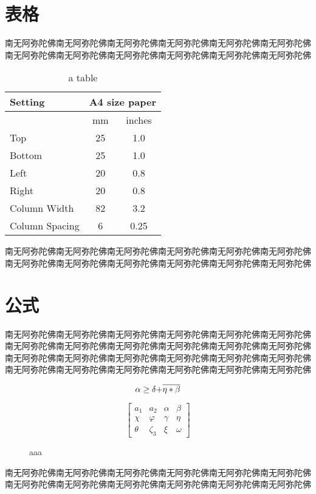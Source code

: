 \documentclass[UTF8,a4paper,10pt]{article}
\begin{document}
\section{表格}
南无阿弥陀佛南无阿弥陀佛南无阿弥陀佛南无阿弥陀佛南无阿弥陀佛南无阿弥陀佛南无阿弥陀佛南无阿弥陀佛南无阿弥陀佛南无阿弥陀佛南无阿弥陀佛南无阿弥陀佛
\par
\vspace{3ex}
\begin{table}[h]
    \centering
    \begin{tabular}{|l|c|c|}\hline
        Setting&\multicolumn{2}{c|}{A4 size paper}\\\hline
        &mm&inches\\
        Top&25&1.0\\
        Bottom&25&1.0\\
        Left&20&0.8\\
        Right&20&0.8\\
        Column Width&82&3.2\\
        Column Spacing&6&0.25\\\hline
    \end{tabular}
    \caption{a table}
    \label{tab:table1}
\end{table}
\vspace{3ex}
\noindent 南无阿弥陀佛南无阿弥陀佛南无阿弥陀佛南无阿弥陀佛南无阿弥陀佛南无阿弥陀佛南无阿弥陀佛南无阿弥陀佛南无阿弥陀佛南无阿弥陀佛南无阿弥陀佛南无阿弥陀佛
\section{公式}
南无阿弥陀佛南无阿弥陀佛南无阿弥陀佛南无阿弥陀佛南无阿弥陀佛南无阿弥陀佛南无阿弥陀佛南无阿弥陀佛南无阿弥陀佛南无阿弥陀佛南无阿弥陀佛南无阿弥陀佛南无阿弥陀佛南无阿弥陀佛南无阿弥陀佛南无阿弥陀佛南无阿弥陀佛南无阿弥陀佛南无阿弥陀佛南无阿弥陀佛南无阿弥陀佛南无阿弥陀佛南无阿弥陀佛南无阿弥陀佛
\noindent
\begin{figure}[h]
\begin{minipage}[h]{0.48\linewidth}
\[\alpha  \ge \delta {\rm{ + }}\overline {\eta  * \beta } \]
\end{minipage}
\begin{minipage}[h]{0.48\linewidth}
\[\left[ {\begin{array}{*{20}{c}}
{{a_1}}&{{a_2}}&\alpha &\beta \\
\chi &\varphi &\gamma &\eta \\
\theta &{{\zeta _3}}&\xi &\omega
\end{array}} \right]\]
\end{minipage}
\vspace{3ex}
\caption{aaa}
\end {figure}
\par\noindent
南无阿弥陀佛南无阿弥陀佛南无阿弥陀佛南无阿弥陀佛南无阿弥陀佛南无阿弥陀佛南无阿弥陀佛南无阿弥陀佛南无阿弥陀佛南无阿弥陀佛南无阿弥陀佛南无阿弥陀佛
\end{document}
